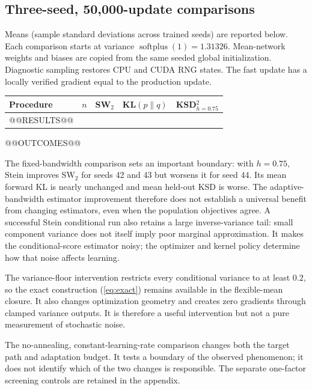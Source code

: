 \documentclass[11pt,a4paper]{article}
\numberwithin{equation}{section}
\begin{document}
\subsection{Three-seed, 50,000-update comparisons}
Means (sample standard deviations across trained seeds) are reported below.
Each comparison starts at variance $\operatorname{softplus}(1)=1.31326$.
Mean-network weights and biases are copied from the same seeded global
initialization. Diagnostic sampling restores CPU and CUDA RNG states. The
fast update has a locally verified gradient equal to the production update.
\begin{center}\small
\begin{tabular}{p{6.1cm}rrrr}\toprule
Procedure & $n$ & SW$_2$ & KL$(p\|q)$ & KSD$^2_{h=0.75}$\\\midrule
@@RESULTS@@
\bottomrule\end{tabular}
\end{center}
@@OUTCOMES@@

The fixed-bandwidth comparison sets an important boundary: with $h=0.75$,
Stein improves SW$_2$ for seeds 42 and 43 but worsens it for seed 44.
Its mean forward KL is nearly unchanged and mean held-out KSD is worse.
The adaptive-bandwidth estimator improvement therefore does not establish
a universal benefit from changing estimators, even when the population
objectives agree. A successful Stein conditional run also retains a large
inverse-variance tail: small component variance does not itself imply poor
marginal approximation. It makes the conditional-score estimator noisy;
the optimizer and kernel policy determine how that noise affects learning.

The variance-floor intervention restricts every conditional variance to at
least $0.2$, so the exact construction (\ref{eq:exact}) remains available in
the flexible-mean closure. It also changes optimization geometry and creates
zero gradients through clamped variance outputs. It is therefore a useful
intervention but not a pure measurement of stochastic noise.

The no-annealing, constant-learning-rate comparison changes both the target
path and adaptation budget. It tests a boundary of the observed phenomenon;
it does not identify which of the two changes is responsible. The separate
one-factor screening controls are retained in the appendix.
\end{document}

